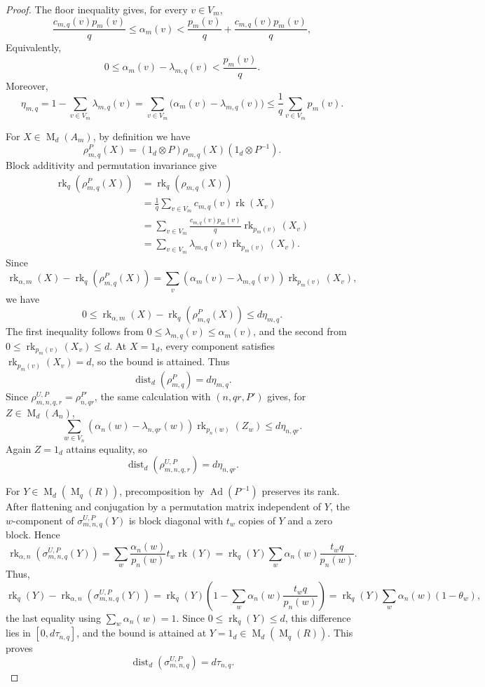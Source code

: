 \documentclass[11pt]{amsart}
\DeclareMathOperator{\rk}{rk}
\DeclareMathOperator{\Mat}{M}
\DeclareMathOperator{\Ad}{Ad}
\theoremstyle{definition}
\theoremstyle{remark}
\begin{document}
\begin{proof}
The floor inequality gives, for every $v\in V_m$,
  \[
\frac{c_{m,q}(v)p_m(v)}q\leq\alpha_m(v)<\frac{p_m(v)}q + \frac{c_{m,q}(v)p_m(v)}q,
\]
Equivalently,
\[
0\leq\alpha_m(v) -  \lambda_{m,q}(v)<\frac{p_m(v)}q.
\]
Moreover,
\[
  \eta_{m,q}
  = 1- \sum_{v\in V_m}\lambda_{m,q}(v)
 =\sum_{v\in V_m}\bigl(\alpha_m(v)-\lambda_{m,q}(v)\bigr)\leq\frac1q\sum_{v\in V_m}p_m(v).
\]

For $X\in\Mat_d(A_m)$, by definition we have
\[
  \rho_{m,q}^{P}(X)
  =(1_d\otimes P)\rho_{m,q}(X)(1_d\otimes P^{-1}).
\]
Block additivity and permutation invariance give
\[
 \begin{aligned}
 \rk_q(\rho_{m,q}^{P}(X))
   & =  \rk_q (\rho_{m,q}(X))\\
   & =\frac1q\sum_{v\in V_m}c_{m,q}(v)\rk(X_v)\\
 &=\sum_{v\in V_m}\frac{c_{m,q}(v)p_m(v)}q
        \rk_{p_m(v)}(X_v)\\
 &=\sum_{v\in V_m}\lambda_{m,q}(v)\rk_{p_m(v)}(X_v).
 \end{aligned}
\]
Since
\[
\rk_{\alpha,m}(X)-\rk_q(\rho_{m,q}^{P}(X))=\sum_v(\alpha_m(v)-\lambda_{m,q}(v))\rk_{p_m(v)}(X_v),
\]
we have
\[
0\leq \rk_{\alpha,m}(X)-\rk_q(\rho_{m,q}^{P}(X))\leq d\eta_{m,q}.
\]
The first inequality follows from
$0\leq\lambda_{m,q}(v)\leq\alpha_m(v)$, and the second from
$0\leq\rk_{p_m(v)}(X_v)\leq d$.
At $X=1_d$, every component satisfies $\rk_{p_m(v)}(X_v)=d$,
so the bound is attained.  Thus
\[
 \operatorname{dist}_d(\rho_{m,q}^{P})=d\eta_{m,q}.
\]
Since $\rho_{m,n,q,r}^{U,P}=\rho_{n,qr}^{P'}$, the same calculation
with $(n,qr,P')$ gives, for $Z\in\Mat_d(A_n)$,
\[
  \sum_{w\in V_n}(\alpha_n(w)-\lambda_{n,qr}(w))
  \rk_{p_n(w)}(Z_w)\leq d\eta_{n,qr}.
\]
Again $Z=1_d$ attains equality, so
\[
\operatorname{dist}_d(\rho_{m,n,q,r}^{U,P})=d\eta_{n,qr}.
\]

For $Y\in\Mat_d(\Mat_q(R))$, precomposition by $\Ad(P^{-1})$
preserves its rank.
After flattening and conjugation by a permutation matrix independent of $Y$,
the $w$-component of $\sigma_{m,n,q}^{U,P}(Y)$ is block diagonal with
$t_w$ copies of $Y$ and a zero block.  Hence
\[
 \rk_{\alpha,n}(\sigma_{m,n,q}^{U,P}(Y))
 =\sum_w\frac{\alpha_n(w)}{p_n(w)}t_w\rk(Y)
 =\rk_q(Y)\sum_w\alpha_n(w)\frac{t_wq}{p_n(w)}.
\]
Thus,
\[
\rk_q(Y) - \rk_{\alpha,n}(\sigma_{m,n,q}^{U,P}(Y)) =
\rk_q(Y)\left(1-\sum_w\alpha_n(w)\frac{t_wq}{p_n(w)}\right) =
\rk_q(Y)\sum_w\alpha_n(w) (1-\theta_w),
\]
the last equality using $\sum_w\alpha_n(w)=1$.
Since $0\leq\rk_q(Y)\leq d$, this difference lies in $[0,d\tau_{n,q}]$, and the bound is
attained at $Y=1_d\in\Mat_d(\Mat_q(R))$.
This proves
\[
\operatorname{dist}_d(\sigma_{m,n,q}^{U,P})=d\tau_{n,q}.
\]


\end{proof}
\end{document}
